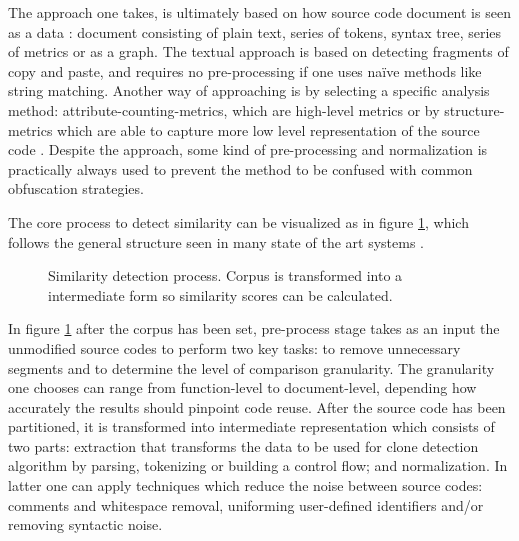 The approach one takes, is ultimately based on how source code document is seen as a data \cite{Roy:2009:CEC:1530898.1531101}: document consisting of plain text, series of tokens, syntax tree, series of metrics or as a graph. The textual approach is based on detecting fragments of copy and paste, and requires no pre-processing if one uses naïve methods like string matching. Another way of approaching is by selecting a specific analysis method: attribute-counting-metrics, which are high-level metrics or by structure-metrics which are able to capture more low level representation of the source code \cite{Verco:1996:SDS:369585.369598}. Despite the approach, some kind of pre-processing and normalization is practically always used to prevent the method to be confused with common obfuscation strategies. 

The core process to detect similarity can be visualized as in figure \ref{fig-sd-flow}, which follows the general structure seen in many state of the art systems \cite{Roy:2009:CEC:1530898.1531101}.

\begin{figure}[!ht]
\centering
\vspace{0.5cm}
\caption{Similarity detection process. Corpus is transformed into a intermediate form so similarity scores can be calculated.}
\label{fig-sd-flow}
\end{figure}

\noindent
In figure \ref{fig-sd-flow} after the corpus has been set, pre-process stage takes as an input the unmodified source codes to perform two key tasks: to remove unnecessary segments and to determine the level of comparison granularity. The granularity one chooses can range from function-level to document-level, depending how accurately the results should pinpoint code reuse. After the source code has been partitioned, it is transformed into intermediate representation which consists of two parts: extraction that transforms the data to be used for clone detection algorithm \eg by parsing, tokenizing or building a control flow; and normalization. In latter one can apply techniques which reduce the noise between source codes: comments and whitespace removal, uniforming user-defined identifiers and/or removing syntactic noise.

